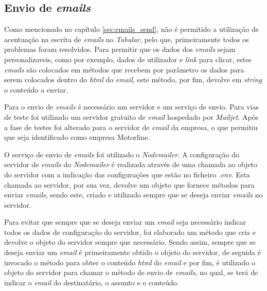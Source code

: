\subsection{Envio de \textit{emails}}
Como mencionado no capítulo \ref{sec:emails_send}, não é permitido a utilização de acentuação na escrita de \textit{emails} no \textit{Tabular}, pelo que, primeiramente todos os problemas foram resolvidos. Para permitir que os dados dos \textit{emails} sejam personalizaveis, como por exemplo, dados de utilizador e \textit{link} para clicar, estes \textit{emails} são colocados em métodos que recebem por parâmetro os dados para serem colocados dentro do \textit{html} do \textit{email}, este método, por fim, devolve em \textit{string} o conteúdo a enviar.

Para o envio de \textit{emails} é necessário um servidor e um serviço de envio. Para vias de teste foi utilizado um servidor gratuito de \textit{email} hospedado por \textit{Mailjet}. Após a fase de testes foi alterado para o servidor de \textit{email} da empresa, o que permitiu que seja identificado como empresa Motorline.

O serviço de envio de \textit{emails} foi utilizado o \textit{Nodemailer}. A configuração do servidor de \textit{emails} do \textit{Nodemailer} é realizada através de uma chamada ao objeto do servidor com a indicação das configurações que estão no ficheiro \textit{.env}. Esta chamada ao servidor, por sua vez, devolve um objeto que fornece métodos para enviar \textit{emails}, sendo este, criado e utilizado sempre que se deseja enviar \textit{emails} no servidor.

Para evitar que sempre que se deseja enviar um \textit{email} seja necessário indicar todos os dados de configuração do servidor, foi elaborado um método que cria e devolve o objeto do servidor sempre que necessário. Sendo assim, sempre que se deseja enviar um \textit{email} é primeiramente obtido o objeto do servidor, de seguida é invocado o método para obter o conteúdo \textit{html} do \textit{email} e por fim, é utilizado o objeto do servidor para chamar o método de envio de \textit{emails}, no qual, se terá de indicar o \textit{email} do destinatário, o assunto e o conteúdo.
